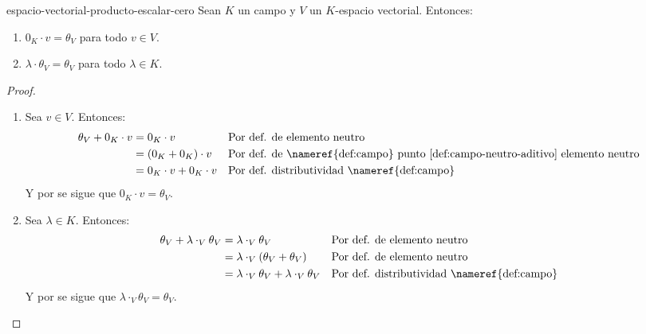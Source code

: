 \begin{proposition}{}{espacio-vectorial-producto-escalar-cero}
    Sean $K$ un campo y $V$ un $K$-espacio vectorial. Entonces:
    \begin{enumerate}
        \item $0_K \cdot v = \theta_V$ para todo $v\in V$.
        \item $\lambda \cdot \theta_V = \theta_V$ para todo $\lambda \in K$.
    \end{enumerate}
\end{proposition}
\begin{proof}
    \begin{enumerate}
        \item Sea $v \in V$. Entonces:
        \begin{align*}
            \theta_V + 0_K \cdot v &= 0_K \cdot v && \text{Por def. de elemento neutro} \\
            &= (0_K + 0_K) \cdot v && \text{Por def. de \nameref{def:campo} punto \ref{def:campo-neutro-aditivo} elemento neutro} \\
            &= 0_K \cdot v + 0_K \cdot v && \text{Por def. distributividad \nameref{def:campo}} \\
        \end{align*}
        Y por  se sigue que $0_K \cdot v = \theta_V$.

        \item Sea $\lambda \in K$. Entonces:
        \begin{align*}
            \theta_V + \lambda \cdot_V \theta_V &= \lambda \cdot_V \theta_V && \text{Por def. de elemento neutro} \\
            &= \lambda \cdot_V (\theta_V + \theta_V) && \text{Por def. de elemento neutro} \\
            &= \lambda \cdot_V \theta_V + \lambda \cdot_V \theta_V && \text{Por def. distributividad \nameref{def:campo}}
        \end{align*}
        Y por  se sigue que $\lambda \cdot_V \theta_V = \theta_V$.

    \end{enumerate}
\end{proof}




